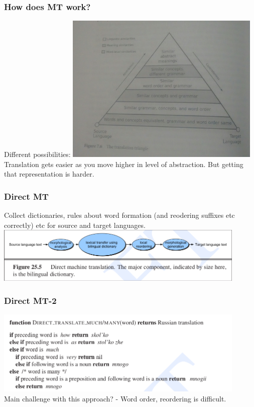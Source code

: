 \documentclass{beamer}
\begin{document}

\begin{frame}
\frametitle{How does MT work?}
Different possibilities: 
\includegraphics[width=0.7\textwidth]{MTPIC.jpg}
\pause Translation gets easier as you move higher in level of abstraction. But getting that representation is harder.
\end{frame}

\begin{frame}
\frametitle{Direct MT}
Collect dictionaries, rules about word formation (and reodering suffixes etc correctly) etc for source and target languages.
\includegraphics[width=0.9\textwidth]{directmt.png}
\end{frame}

\begin{frame}
\frametitle{Direct MT-2}
\includegraphics[width=0.9\textwidth]{directprogram.png}
\\ Main challenge with this approach? \pause - Word order, reordering is difficult.
\end{frame}
\end{document}
